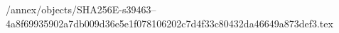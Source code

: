 /annex/objects/SHA256E-s39463--4a8f69935902a7db009d36e5e1f078106202c7d4f33c80432da46649a873def3.tex
